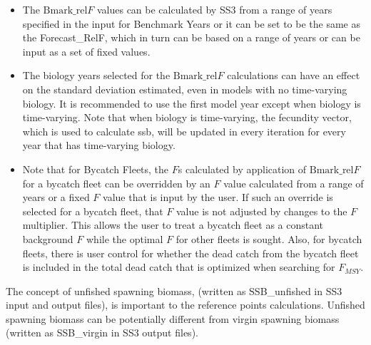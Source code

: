 \begin{itemize}
	\item The $\text{Bmark\_rel}F$ values can be calculated by SS3 from a range of years specified in the input for Benchmark Years or it can be set to be the same as the Forecast\_RelF, which in turn can be based on a range of years or can be input as a set of fixed values.
	
	\item The biology years selected for the $\text{Bmark\_rel}F$ calculations can have an effect on the standard deviation estimated, even in models with no time-varying biology. It is recommended to use the first model year except when biology is time-varying. Note that when biology is time-varying, the fecundity vector, which is used to calculate \gls{ssb}, will be updated in every iteration for every year that has time-varying biology.
	
	\item Note that for Bycatch Fleets, the $F$s calculated by application of $\text{Bmark\_rel}F$ for a bycatch fleet can be overridden by an $F$ value calculated from a range of years or a fixed $F$ value that is input by the user. If such an override is selected for a bycatch fleet, that $F$ value is not adjusted by changes to the $F$ multiplier. This allows the user to treat a bycatch fleet as a constant background $F$ while the optimal $F$ for other fleets is sought. Also, for bycatch fleets, there is user control for whether the dead catch from the bycatch fleet is included in the total dead catch that is optimized when searching for $F_{MSY}$.
\end{itemize}

The concept of unfished spawning biomass, (written as SSB\_unfished in SS3 input and output files), is important to the reference points calculations. Unfished spawning biomass can be potentially different from virgin spawning biomass (written as SSB\_virgin in SS3 output files).

